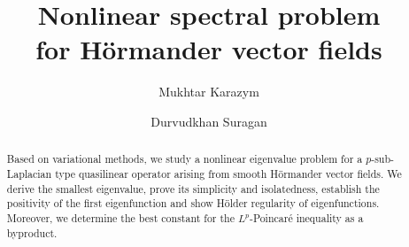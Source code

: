 \documentclass[a4paper,12pt,reqno]{amsart}
\numberwithin{equation}{section}
\theoremstyle{plain}
\theoremstyle{definition}
\begin{document}
   \title[Nonlinear spectral problems  for H\"ormander vector fields]
   {Nonlinear spectral problem \\ for H\"ormander vector fields}

\author[M. Karazym]{Mukhtar Karazym}
\address{
  Mukhtar Karazym:
  \endgraf
  Department of Mathematics
  \endgraf
Nazarbayev University, Kazakhstan
  \endgraf
  {\it E-mail address} {\rm mukhtarkarazym@gmail.com; mukhtar.karazym@nu.edu.kz}
  }

 \author[D. Suragan]{Durvudkhan Suragan}
\address{
	Durvudkhan Suragan:
	\endgraf
	Department of Mathematics
	\endgraf
Nazarbayev University, Kazakhstan
	\endgraf
	{\it E-mail address} {\rm durvudkhan.suragan@nu.edu.kz}
} 




\begin{abstract} 
Based on variational methods, we study a nonlinear eigenvalue problem for a $p$-sub-Laplacian type quasilinear operator arising from smooth H\"ormander vector fields. We derive the smallest eigenvalue, prove its simplicity and  isolatedness, establish  the positivity of the first eigenfunction and show  H\"older regularity of eigenfunctions.  Moreover, we determine the best constant for the $L^{p}$-Poincar\'e inequality as a byproduct.
\end{abstract}
\maketitle

\end{document}
